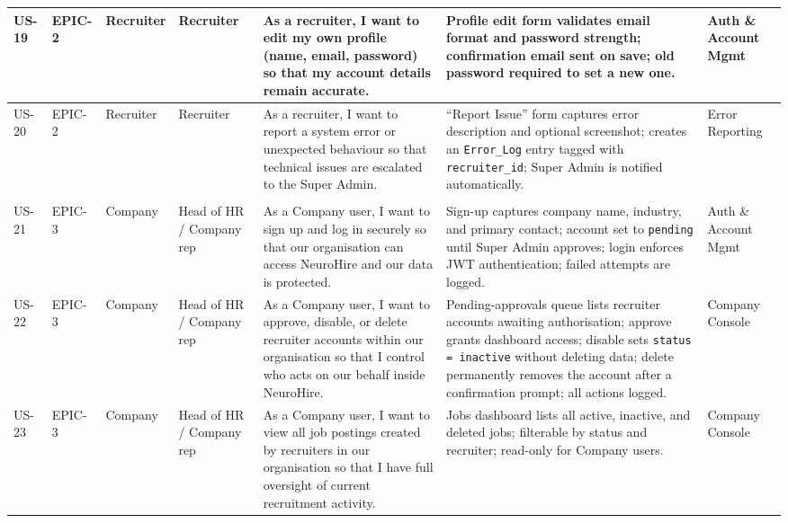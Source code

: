 \begin{longtable}{|p{0.8cm}|p{1.0cm}|p{1.2cm}|p{1.4cm}|p{4.2cm}|p{4.2cm}|p{1.8cm}|}
\rowcolor{nhRow2}
US-19 & EPIC-2 & Recruiter & Recruiter &
As a recruiter, I want to edit my own profile (name, email, password) so that my account details remain accurate. &
Profile edit form validates email format and password strength; confirmation email sent on save; old password required to set a new one. &
Auth \& Account Mgmt \\
\hline

\rowcolor{nhRow2}
US-20 & EPIC-2 & Recruiter & Recruiter &
As a recruiter, I want to report a system error or unexpected behaviour so that technical issues are escalated to the Super Admin. &
``Report Issue'' form captures error description and optional screenshot; creates an \texttt{Error\_Log} entry tagged with \texttt{recruiter\_id}; Super Admin is notified automatically. & Error Reporting \\
\hline

\rowcolor{nhEpic3}
\multicolumn{7}{|l|}{\hspace{4pt}\textcolor{nhEpic3txt}{\textbf{EPIC-3 \quad Company (Head of HR) Management}}}\\
\hline

\rowcolor{nhRow3}
US-21 & EPIC-3 & Company & Head of HR / Company rep &
As a Company user, I want to sign up and log in securely so that our organisation can access NeuroHire and our data is protected. &
Sign-up captures company name, industry, and primary contact; account set to \texttt{pending} until Super Admin approves; login enforces JWT authentication; failed attempts are logged. &
Auth \& Account Mgmt \\
\hline

\rowcolor{nhRow3}
US-22 & EPIC-3 & Company & Head of HR / Company rep &
As a Company user, I want to approve, disable, or delete recruiter accounts within our organisation so that I control who acts on our behalf inside NeuroHire. &
Pending-approvals queue lists recruiter accounts awaiting authorisation; approve grants dashboard access; disable sets \texttt{status = inactive} without deleting data; delete permanently removes the account after a confirmation prompt; all actions logged. & Company Console \\
\hline

\rowcolor{nhRow3}
US-23 & EPIC-3 & Company & Head of HR / Company rep &
As a Company user, I want to view all job postings created by recruiters in our organisation so that I have full oversight of current recruitment activity. &
Jobs dashboard lists all active, inactive, and deleted jobs; filterable by status and recruiter; read-only for Company users. & Company Console \\
\hline


\end{longtable}

